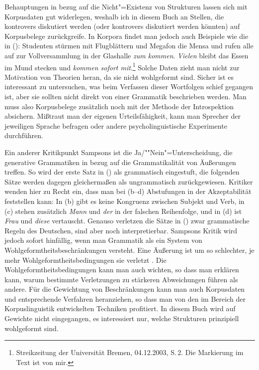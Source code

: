 Behauptungen in bezug auf die Nicht"=Existenz von Strukturen lassen sich mit Korpusdaten gut widerlegen,
weshalb ich in diesem Buch an Stellen, die kontrovers diskutiert werden (oder kontrovers diskutiert
werden könnten) auf Korpusbelege zurückgreife. In Korpora findet man jedoch auch Beispiele wie die in ():
\ea
Studenten stürmen mit Flugblättern und Megafon die Mensa und rufen alle auf zur Vollversammlung
in der Glashalle \emph{zum kommen}. \emph{Vielen} bleibt das Essen im Mund stecken und \emph{kommen sofort mit}.\footnote{
  Streikzeitung der Universität Bremen, 04.12.2003, S.\,2. Die Markierung im Text ist von mir.%
}
\z
Solche Daten zieht man nicht zur Motivation von Theorien heran, da sie nicht wohlgeformt sind.
Sicher ist es interessant zu untersuchen, was beim Verfassen dieser Wortfolgen schief gegangen ist, aber
sie sollten nicht direkt von einer Grammatik beschrieben werden. Man muss also Korpusbelege zusätzlich
noch mit der Methode der Introspektion absichern. Mißtraut man der eigenen Urteilsfähigkeit, kann
man Sprecher der jeweiligen Sprache befragen oder andere psycholinguistische Experimente
durchführen.

Ein anderer Kritikpunkt Sampsons ist die Ja/""Nein"=Unterscheidung, die generative Grammatiken in bezug
auf die Grammatikalität von Äußerungen treffen. So wird der erste Satz in () als grammatisch eingestuft,
die folgenden Sätze werden dagegen gleichermaßen als ungrammatisch zurückgewiesen.
\eal
{}
\zl
Kritiker wenden hier zu Recht ein, dass man bei (b--d) Abstufungen in der Akzeptabilität
feststellen kann: In (b) gibt es keine Kongruenz zwischen Subjekt und Verb, in (c)
stehen zusätzlich \emph{Mann} und \emph{der} in der falschen Reihenfolge, und in (d) ist \emph{Frau}
und \emph{diese} vertauscht. Genauso verletzen die Sätze in () zwar grammatische
Regeln des Deutschen, sind aber noch interpretierbar.
Sampsons Kritik wird jedoch sofort hinfällig, wenn man Grammatik als ein System
von Wohlgeformtheitsbeschränkungen versteht. Eine Äußerung ist um so schlechter,
je mehr Wohlgeformtheitsbedingungen sie verletzt \citep[--27]{PS2001a}. Die
Wohlgeformtheitsbedingungen kann man auch wichten, 
so dass man erklären kann, warum bestimmte Verletzungen zu stärkeren Abweichungen führen als andere.
Für die Gewichtung von Beschränkungen kann man auch Korpusdaten und entsprechende Verfahren
heranziehen, so dass man von den im Bereich der Korpuslinguistik entwickelten Techniken profitiert.
In diesem Buch wird auf Gewichte nicht eingegangen,
es interessiert nur, welche Strukturen prinzipiell wohlgeformt sind.







